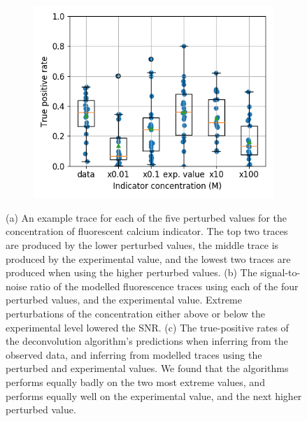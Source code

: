 \documentclass[a4paper,12pt]{article}
\theoremstyle{definition}
\begin{document}
\begin{figure}[h]
\begin{subfigure}{0.25\textwidth}
        \includegraphics[width=\linewidth]{figures/indictor_perturbed_oasis_first_paper.png}
        \caption{}
    \end{subfigure}
    \caption{(a) An example trace for each of the five perturbed values for the concentration of fluorescent calcium indicator. The top two traces are produced by the lower perturbed values, the middle trace is produced by the experimental value, and the lowest two traces are produced when using the higher perturbed values. (b) The signal-to-noise ratio of the modelled fluorescence traces using each of the four perturbed values, and the experimental value. Extreme perturbations of the concentration either above or below the experimental level lowered the SNR. (c) The true-positive rates of the deconvolution algorithm's predictions when inferring from the observed data, and inferring from modelled traces using the perturbed and experimental values. We found that the algorithms performs equally badly on the two most extreme values, and performs equally well on the experimental value, and the next higher perturbed value.}
    \label{fig:indicator_perturbed}
\end{figure}
\end{document}
